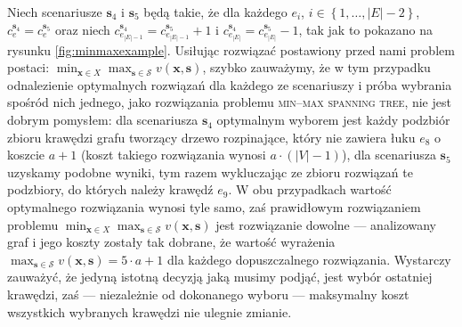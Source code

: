 Niech scenariusze $\textbf{s}_{4}$ i $\textbf{s}_{5}$ będą takie, że dla każdego $e_{i}$, $i \in \left\{ 1, \dots, \left| E \right| - 2 \right\}$, $c^{\textbf{s}_{4}}_{e} = c^{\textbf{s}_{5}}_{e}$ oraz niech $c^{\textbf{s}_{4}}_{e_{\left| E \right| - 1}} = c^{\textbf{s}_{5}}_{e_{\left| E \right| - 1}} + 1$ i $c^{\textbf{s}_{4}}_{e_{\left| E \right|}} = c^{\textbf{s}_{5}}_{e_{\left| E \right|}} - 1$, tak jak to pokazano na rysunku \ref{fig:minmaxexample}. Usiłując rozwiązać postawiony przed nami problem postaci: $\min_{\textbf{x} \in X} \max_{\textbf{s} \in \mathcal{S}} v \left( \textbf{x}, \textbf{s} \right)$, szybko zauważymy, że w tym przypadku odnalezienie optymalnych rozwiązań dla każdego ze scenariuszy i próba wybrania spośród nich jednego, jako rozwiązania problemu \textsc{min--max spanning tree}, nie jest dobrym pomysłem: dla scenariusza $\textbf{s}_{4}$ optymalnym wyborem jest każdy podzbiór zbioru krawędzi grafu tworzący drzewo rozpinające, który nie zawiera łuku $e_{8}$ o koszcie $a+1$ (koszt takiego rozwiązania wynosi $a \cdot \left( \left| V \right| - 1 \right)$), dla scenariusza $\textbf{s}_{5}$ uzyskamy podobne wyniki, tym razem wykluczając ze zbioru rozwiązań te podzbiory, do których należy krawędź $e_{9}$. W obu przypadkach wartość optymalnego rozwiązania wynosi tyle samo, zaś prawidłowym rozwiązaniem problemu $\min_{\textbf{x} \in X} \max_{\textbf{s} \in \mathcal{S}} v \left( \textbf{x}, \textbf{s} \right)$ jest rozwiązanie dowolne --- analizowany graf i jego koszty zostały tak dobrane, że wartość wyrażenia $\max_{\textbf{s} \in \mathcal{S}} v \left( \textbf{x}, \textbf{s} \right) = 5 \cdot a + 1$ dla każdego dopuszczalnego rozwiązania. Wystarczy zauważyć, że jedyną istotną decyzją jaką musimy podjąć, jest wybór ostatniej krawędzi, zaś --- niezależnie od dokonanego wyboru --- maksymalny koszt wszystkich wybranych krawędzi nie ulegnie zmianie.

